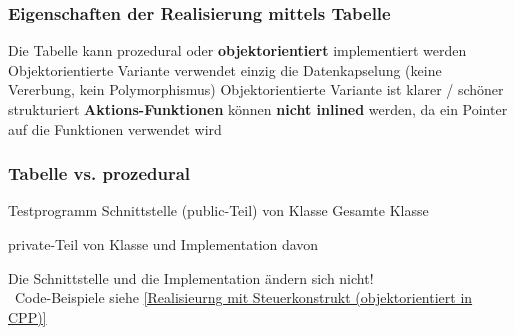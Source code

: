 \subsubsection{Eigenschaften der Realisierung mittels Tabelle}

\begin{outline}
    \1 Die Tabelle kann prozedural oder \textbf{objektorientiert} implementiert werden
        \2 Objektorientierte Variante verwendet einzig die Datenkapselung (keine Vererbung, kein Polymorphismus)
        \2 Objektorientierte Variante ist klarer / schöner strukturiert
    \1 \textbf{Aktions-Funktionen} können \textbf{nicht inlined} werden, da ein Pointer auf die Funktionen verwendet wird
\end{outline}


\subsubsection{Tabelle vs. prozedural}

\begin{minipage}[t]{0.48\columnwidth}
    \raggedright
    
    \vspace{0.1cm}

    \begin{outline}
        \1 Testprogramm 
        \1 Schnittstelle (public-Teil) von Klasse 
        \1 Gesamte Klasse 
    \end{outline}
\end{minipage}
\hfill
\begin{minipage}[t]{0.48\columnwidth}
    \raggedright
    
    \vspace{0.1cm}

    \begin{outline}
        \1 private-Teil von Klasse  und Implementation davon
    \end{outline}
\end{minipage}



Die Schnittstelle  und die Implementation  ändern sich nicht! \\
\textrightarrow\ Code-Beispiele siehe \ref{Realisieurng mit Steuerkonstrukt (objektorientiert in CPP)}

